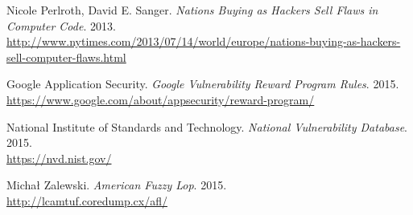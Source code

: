 \documentclass[a4paper,12pt]{article}
\begin{document}
\begin{thebibliography}{}
		Nicole Perlroth, David E. Sanger. \textit{Nations Buying as Hackers Sell Flaws in Computer Code}. 2013.\\
		\url{http://www.nytimes.com/2013/07/14/world/europe/nations-buying-as-hackers-sell-computer-flaws.html}
		
		Google Application Security. \textit{Google Vulnerability Reward Program Rules}. 2015.\\
		\url{https://www.google.com/about/appsecurity/reward-program/}
		
		National Institute of Standards and Technology. \textit{National Vulnerability Database}. 2015.\\
		\url{https://nvd.nist.gov/}
		
		Michał Zalewski. \textit{American Fuzzy Lop}. 2015.\\
		\url{http://lcamtuf.coredump.cx/afl/}
		
	\end{thebibliography}
	\endgroup
\end{document}
